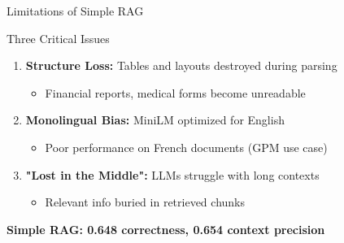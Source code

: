 \documentclass[aspectratio=169]{beamer}
\begin{document}
\begin{frame}{Limitations of Simple RAG}
\begin{alertblock}{Three Critical Issues}
\begin{enumerate}
    \item \textbf{Structure Loss:} Tables and layouts destroyed during parsing
    \begin{itemize}
        \item Financial reports, medical forms become unreadable
    \end{itemize}
    
    \item \textbf{Monolingual Bias:} MiniLM optimized for English
    \begin{itemize}
        \item Poor performance on French documents (GPM use case)
    \end{itemize}
    
    \item \textbf{"Lost in the Middle":} LLMs struggle with long contexts
    \begin{itemize}
        \item Relevant info buried in retrieved chunks
    \end{itemize}
\end{enumerate}
\end{alertblock}

\vspace{0.3cm}
\begin{center}
\textcolor{torusred}{\textbf{Simple RAG: 0.648 correctness, 0.654 context precision}}
\end{center}
\end{frame}
\end{document}

